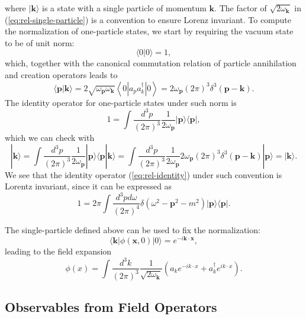 \documentclass[aps,prb,superscriptaddress,nofootinbib]{revtex4}
\begin{document}
where $|\bm{k}\rangle$ is a state with a single particle of momentum $\bm{k}$.
The factor of $\sqrt{2 \omega_{\bm k}}$ in (\ref{eq:rel-single-particle}) is a convention to ensure Lorenz invariant.
To compute the normalization of one-particle states, we start by requiring the vacuum state to be of unit norm:
\begin{equation}
	\langle 0|0\rangle=1,
\end{equation}
which, together with the canonical commutation relation of particle annihilation and creation operators leads to
\begin{equation}
	\langle\bm{p}|\bm{k}\rangle 
	= 2\sqrt{\omega_{\bm p} \omega_{\bm k}}\left\langle 0\left|a_{p} a_{k}^{\dagger}\right| 0\right\rangle
	= 2 \omega_{\bm p}(2\pi)^{3} \delta^{3}(\bm{p}-\bm{k}).
\end{equation}
The identity operator for one-particle states under such norm is
\begin{equation}
	1=\int \frac{d^{3} p}{(2\pi)^{3}} \frac{1}{2\omega_{\bm p}}|\bm{p}\rangle\langle\bm{p}|, \label{eq:rel-identity}
\end{equation}
which we can check with
\begin{equation*}
	|\bm{k}\rangle
	=\int \frac{d^{3} p}{(2\pi)^{3}} \frac{1}{2\omega_{\bm p}}|\bm{p}\rangle\langle\bm{p}|\bm{k}\rangle
	=\int \frac{d^{3} p}{(2\pi)^{3}} \frac{1}{2\omega_{\bm p}} 2\omega_{\bm p}(2\pi)^3 \delta^3(\bm{p}-\bm{k})|\bm{p}\rangle
	=|\bm{k}\rangle.
\end{equation*}
We see that the identity operator (\ref{eq:rel-identity}) under such convention is Lorentz invariant, since it can be expressed as
\begin{equation}
	1 = 2\pi \int \frac{d^{3} p d\omega}{(2\pi)^{4}} \delta(\omega^2-{\bm{p}}^2-m^2) |\bm p\rangle\langle \bm p|.
\end{equation}

The single-particle defined above can be used to fix the normalization:
\begin{equation}
	\langle \bm k|\phi(\bm x,0)|0\rangle = e^{-i \bm k\cdot \bm x},
\end{equation}
leading to the field expansion
\begin{equation}
	\phi(x)
	=\int \frac{d^{3} k}{(2\pi)^{3}} \frac{1}{\sqrt{2\omega_{\bm k}}}\left(a_k 
		e^{-i k \cdot x}+a_k^{\dagger} e^{i k \cdot x}\right).
\end{equation}




\subsection{Observables from Field Operators}
\end{document}
